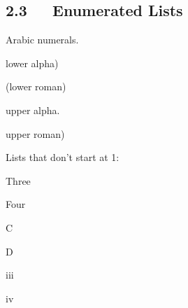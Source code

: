 \documentclass[10pt,a4paper,english]{article}
\begin{document}
\subsection*{2.3~~~Enumerated Lists}
\begin{list}{.}
{
\setlength{\rightmargin}{\leftmargin}
}
\item {} 
Arabic numerals.
\begin{list}{)}
{
\setlength{\rightmargin}{\leftmargin}
}
\item {} 
lower alpha)
\begin{list}{()}
{
\setlength{\rightmargin}{\leftmargin}
}
\item {} 
(lower roman)
\begin{list}{.}
{
\setlength{\rightmargin}{\leftmargin}
}
\item {} 
upper alpha.
\begin{list}{)}
{
\setlength{\rightmargin}{\leftmargin}
}
\item {} 
upper roman)

\end{list}

\end{list}

\end{list}

\end{list}

\item {} 
Lists that don't start at 1:
\begin{list}{.}
{
\addtocounter{listcnt6}{2}
\setlength{\rightmargin}{\leftmargin}
}
\item {} 
Three

\item {} 
Four

\end{list}
\begin{list}{.}
{
\addtocounter{listcnt7}{2}
\setlength{\rightmargin}{\leftmargin}
}
\item {} 
C

\item {} 
D

\end{list}
\begin{list}{.}
{
\addtocounter{listcnt8}{2}
\setlength{\rightmargin}{\leftmargin}
}
\item {} 
iii

\item {} 
iv

\end{list}

\end{list}
\end{document}

